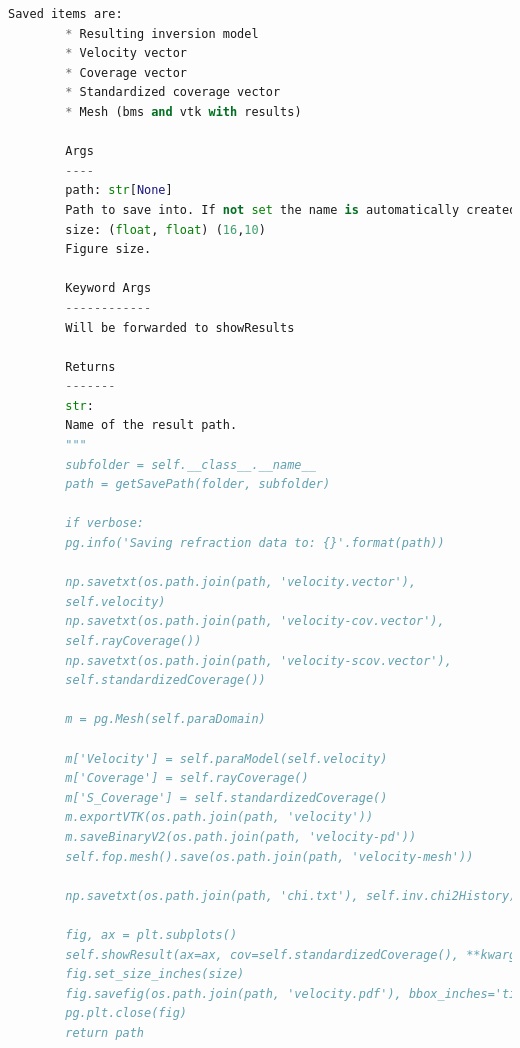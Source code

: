 \documentclass[a4paper, 12 pt]{article} %
\begin{document}
\begin{lstlisting}[language=Python, caption=Código-fonte para pygimli.physics.traveltime.TravelTimeManager]
		Saved items are:
		* Resulting inversion model
		* Velocity vector
		* Coverage vector
		* Standardized coverage vector
		* Mesh (bms and vtk with results)
		
		Args
		----
		path: str[None]
		Path to save into. If not set the name is automatically created
		size: (float, float) (16,10)
		Figure size.
		
		Keyword Args
		------------
		Will be forwarded to showResults
		
		Returns
		-------
		str:
		Name of the result path.
		"""
		subfolder = self.__class__.__name__
		path = getSavePath(folder, subfolder)
		
		if verbose:
		pg.info('Saving refraction data to: {}'.format(path))
		
		np.savetxt(os.path.join(path, 'velocity.vector'),
		self.velocity)
		np.savetxt(os.path.join(path, 'velocity-cov.vector'),
		self.rayCoverage())
		np.savetxt(os.path.join(path, 'velocity-scov.vector'),
		self.standardizedCoverage())
		
		m = pg.Mesh(self.paraDomain)
		
		m['Velocity'] = self.paraModel(self.velocity)
		m['Coverage'] = self.rayCoverage()
		m['S_Coverage'] = self.standardizedCoverage()
		m.exportVTK(os.path.join(path, 'velocity'))
		m.saveBinaryV2(os.path.join(path, 'velocity-pd'))
		self.fop.mesh().save(os.path.join(path, 'velocity-mesh'))
		
		np.savetxt(os.path.join(path, 'chi.txt'), self.inv.chi2History)
		
		fig, ax = plt.subplots()
		self.showResult(ax=ax, cov=self.standardizedCoverage(), **kwargs)
		fig.set_size_inches(size)
		fig.savefig(os.path.join(path, 'velocity.pdf'), bbox_inches='tight')
		pg.plt.close(fig)
		return path

\end{lstlisting}
\end{document}
